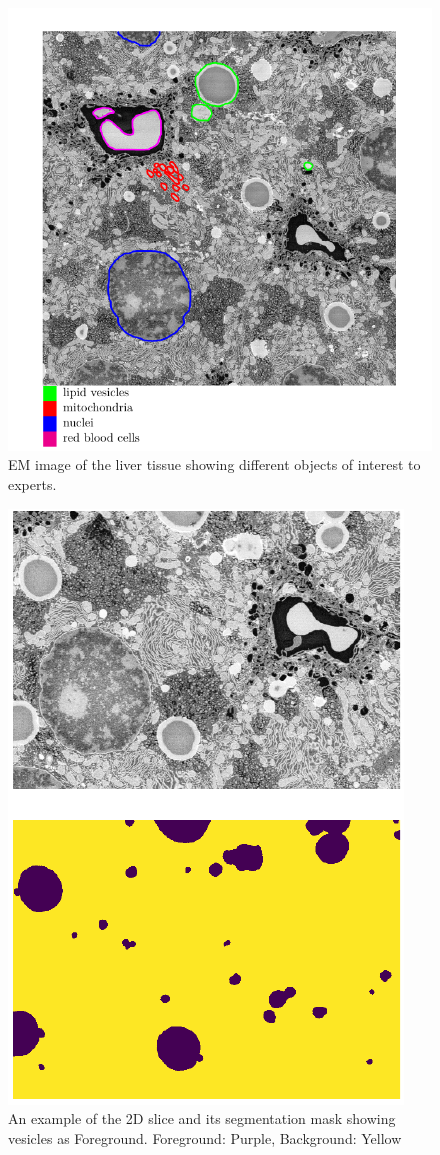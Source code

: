\begin{figure}[h!] \label{fig:vesicles}
\centering
 \includegraphics[width=0.8\linewidth]{figures/vesicles.png}
\caption{EM image of the liver tissue showing different objects of interest to experts.}
\end{figure}

\begin{figure}[h!] \label{fig:2dslice}
\centering
\includegraphics[width=0.65\linewidth,angle=90]{figures/ex_slice.png}
\caption{An example of the 2D slice and its segmentation mask showing vesicles as Foreground. Foreground: Purple, Background: Yellow}
\end{figure}


